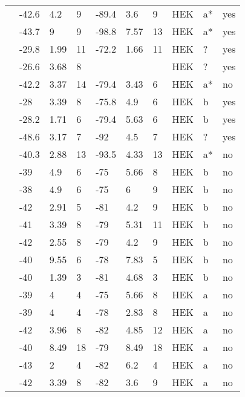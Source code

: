 \begin{longtable}{p{6cm}|lll|lll|lll}
\citet{Smits2005aMutationDB} & -42.6 & 4.2 & 9 & -89.4 & 3.6 & 9 & HEK & a* & yes \\
\citet{Smits2005bMutationDB} & -43.7 & 9 & 9 & -98.8 & 7.57 & 13 & HEK & a* & yes \\
\citet{Sottas2013MutationDB} & -29.8 & 1.99 & 11 & -72.2 & 1.66 & 11 & HEK & ? & yes \\
\citet{Splawski2002MutationDB} & -26.6 & 3.68 & 8 & && & HEK & ? & yes \\
\citet{Surber2008MutationDB} & -42.2 & 3.37 & 14 & -79.4 & 3.43 & 6 & HEK & a* & no \\
\citet{Swan2014MutationDB} & -28 & 3.39 & 8 & -75.8 & 4.9 & 6 & HEK & b & yes \\
\citet{Swan2014MutationDB} & -28.2 & 1.71 & 6 & -79.4 & 5.63 & 6 & HEK & b & yes \\
\citet{Tan2001MutationDB} & -48.6 & 3.17 & 7 & -92 & 4.5 & 7 & HEK & ? & yes \\
\citet{Tan2002MutationDB} & -40.3 & 2.88 & 13 & -93.5 & 4.33 & 13 & HEK & a* & no \\
\citet{Tan2005MutationDB} & -39 & 4.9 & 6 & -75 & 5.66 & 8 & HEK & b & no \\
\citet{Tan2005MutationDB} & -38 & 4.9 & 6 & -75 & 6 & 9 & HEK & b & no \\
\citet{Tan2005MutationDB} & -42 & 2.91 & 5 & -81 & 4.2 & 9 & HEK & b & no \\
\citet{Tan2005MutationDB} & -41 & 3.39 & 8 & -79 & 5.31 & 11 & HEK & b & no \\
\citet{Tan2005MutationDB} & -42 & 2.55 & 8 & -79 & 4.2 & 9 & HEK & b & no \\
\citet{Tan2005MutationDB} & -40 & 9.55 & 6 & -78 & 7.83 & 5 & HEK & b & no \\
\citet{Tan2005MutationDB} & -40 & 1.39 & 3 & -81 & 4.68 & 3 & HEK & b & no \\
\citet{Tan2005MutationDB} & -39 & 4 & 4 & -75 & 5.66 & 8 & HEK & a & no \\
\citet{Tan2005MutationDB} & -39 & 4 & 4 & -78 & 2.83 & 8 & HEK & a & no \\
\citet{Tan2005MutationDB} & -42 & 3.96 & 8 & -82 & 4.85 & 12 & HEK & a & no \\
\citet{Tan2005MutationDB} & -40 & 8.49 & 18 & -79 & 8.49 & 18 & HEK & a & no \\
\citet{Tan2005MutationDB} & -43 & 2 & 4 & -82 & 6.2 & 4 & HEK & a & no \\
\citet{Tan2005MutationDB} & -42 & 3.39 & 8 & -82 & 3.6 & 9 & HEK & a & no \\

\end{longtable}
